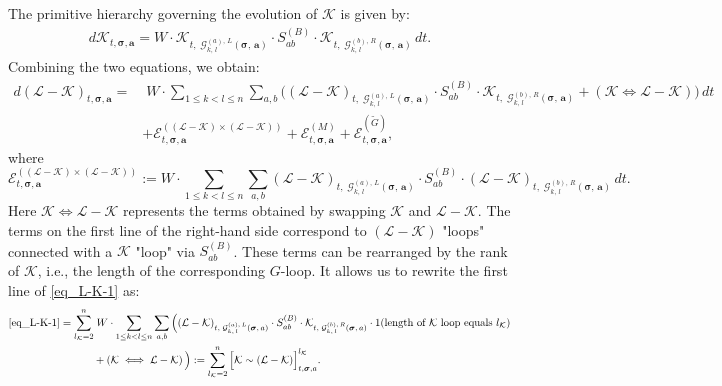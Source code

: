\documentclass[10pt,reqno]{article}
\theoremstyle{plain} %
\theoremstyle{remark}
\numberwithin{equation}{section}
\begin{document}
The primitive hierarchy governing the evolution of \(\mathcal{K}\) is given by:
\begin{align}
    d\mathcal{K}_{t, \boldsymbol{\sigma}, \textbf{a}} = 
    W\cdot\mathcal{K}_{t,\;  \mathcal{G}^{(a), \,L}_{k, \,l}\left(\boldsymbol{\sigma},\, \textbf{a}\right)} \cdot S^{(B)}_{ab} \cdot \mathcal{K}_{t,\;  \mathcal{G}^{(b), \,R}_{k, \,l}\left(\boldsymbol{\sigma},\, \textbf{a}\right)} \, dt.
\end{align}
Combining the two equations, we obtain:
\begin{align}\label{eq_L-K-1}
    d(\mathcal{L} - \mathcal{K})_{t, \boldsymbol{\sigma}, \textbf{a}} 
    = &\; 
   W\cdot \sum_{1 \leq k < l \leq n} \sum_{a, b} 
   \Big( 
   (\mathcal{L} - \mathcal{K})_{t,\;  \mathcal{G}^{(a), \,L}_{k, \,l}\left(\boldsymbol{\sigma},\, \textbf{a}\right)} 
   \cdot S^{(B)}_{ab}
   \cdot 
   \mathcal{K}_{t,\;  \mathcal{G}^{(b), \,R}_{k, \,l}\left(\boldsymbol{\sigma},\, \textbf{a}\right)} 
     +  
     \left(\mathcal{K} \iff \mathcal{L-K} \right)
   \Big) \, dt \nonumber \\ 
    & + \mathcal{E}^{((\mathcal{L} - \mathcal{K}) \times (\mathcal{L} - \mathcal{K}))}_{t, \boldsymbol{\sigma}, \textbf{a}} 
    + \mathcal{E}^{(M)}_{t, \boldsymbol{\sigma}, \textbf{a}} 
    + \mathcal{E}^{(\widetilde{G})}_{t, \boldsymbol{\sigma}, \textbf{a}}, 
\end{align}
where
\begin{equation}\label{def_ELKLK}
    \mathcal{E}^{((\mathcal{L} - \mathcal{K}) \times (\mathcal{L} - \mathcal{K}))}_{t, \boldsymbol{\sigma}, \textbf{a}} :=
    W\cdot\sum_{1 \leq k < l \leq n} \sum_{a, b} (\mathcal{L} - \mathcal{K})_{t,\;  \mathcal{G}^{(a), \,L}_{k, \,l}\left(\boldsymbol{\sigma},\, \textbf{a}\right)} \cdot  S^{(B)}_{ab} \cdot (\mathcal{L} - \mathcal{K})_{t,\;  \mathcal{G}^{(b), \,R}_{k, \,l}\left(\boldsymbol{\sigma},\, \textbf{a}\right)} \, dt.
\end{equation}
Here \( \mathcal{K} \iff \mathcal{L-K} \) represents the terms obtained by swapping \(\mathcal{K}\) and \(\mathcal{L-K}\). The terms on the first line of the right-hand side correspond to \((\mathcal{L} - \mathcal{K})\) "loops" connected with a \(\mathcal{K}\) "loop" via \(S^{(B)}_{ab}\). These terms can be rearranged by the rank of $\mathcal{K}$, i.e., the length of the corresponding $G$-loop. It
 allows us to rewrite the first line of \eqref{eq_L-K-1} as:
\begin{align}\label{DefKsimLK}
\eqref{eq_L-K-1} = \sum_{l_{\cal K}=2}^n &\; W\cdot \sum_{1 \leq k < l \leq n} \sum_{a, b}  
   \Big( 
   (\mathcal{L} - \mathcal{K})_{t,\;  \mathcal{G}^{(a), \,L}_{k, \,l}\left(\boldsymbol{\sigma},\, \textbf{a}\right)} 
   \cdot S^{(B)}_{ab}
   \cdot 
   \mathcal{K}_{t,\;  \mathcal{G}^{(b), \,R}_{k, \,l}\left(\boldsymbol{\sigma},\, \textbf{a}\right)} \cdot \textbf{1}(\text{length of $\mathcal{K}$ loop equals } l_\mathcal{K})   \nonumber \\
   & + \left(\mathcal{K} \iff \mathcal{L-K} \right) \Big) 
    := \sum_{l_{\cal K}=2}^n\Big[\mathcal{K} \sim (\mathcal{L} - \mathcal{K})\Big]^{l_\mathcal{K}}_{t, \boldsymbol{\sigma}, \textbf{a}}.
\end{align}
\end{document}
